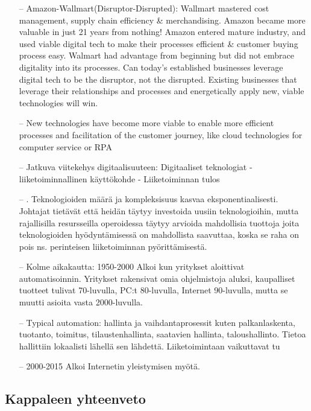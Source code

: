 \documentclass[finnish,12pt,a4paper,pdftex]{article}
\begin{document}
\citep{lamoureux}

\begin{itemize}
\item[--]Amazon-Wallmart(Disruptor-Disrupted): Wallmart mastered cost management, supply chain efficiency & merchandising. Amazon became more valuable in just 21 years from nothing! Amazon entered mature industry, and used viable digital tech to make their processes efficient & customer buying process easy. Walmart had advantage from beginning but did not embrace digitality into its processes. Can today’s established businesses leverage digital tech to be the disruptor, not the disrupted. Existing businesses that leverage their relationships  and processes and energetically apply new, viable technologies will win.
\item[--]New technologies have become more viable to enable more efficient processes and facilitation of the customer journey, like cloud technologies for computer service or RPA 
\item[--]\citep{lamoureux}
Jatkuva viitekehys digitaalisuuteen:
Digitaaliset teknologiat - liiketoiminnallinen käyttökohde - Liiketoiminnan tulos
\item[--]\citep{lamoureux}.
Teknologioiden määrä ja kompleksisuus kasvaa eksponentiaalisesti. Johtajat tietävät että heidän täytyy investoida uusiin teknologioihin, mutta rajallisilla resursseilla operoidessa täytyy arvioida mahdollisia tuottoja joita teknologioiden hyödyntämisessä on mahdollista saavuttaa, koska se raha on pois ns. perinteisen liiketoiminnan pyörittämisestä.
\item[--]Kolme aikakautta:
1950-2000  Alkoi kun yritykset aloittivat automatisoinnin. Yritykset rakensivat omia ohjelmistoja aluksi, kaupalliset tuotteet tulivat 70-luvulla, PC:t 80-luvulla, Internet 90-luvulla, mutta se muutti asioita vasta 2000-luvulla.
\item[--]Typical automation: hallinta ja vaihdantaprosessit kuten palkanlaskenta, tuotanto, toimitus, tilaustenhallinta, saatavien hallinta, taloushallinto. Tietoa hallittiin lokaalisti lähellä sen lähdettä. 
Liiketoimintaan vaikuttavat tu
\item[--]2000-2015 Alkoi Internetin yleistymisen myötä. 
\end{itemize}




\subsection{Kappaleen yhteenveto}
\end{document}
